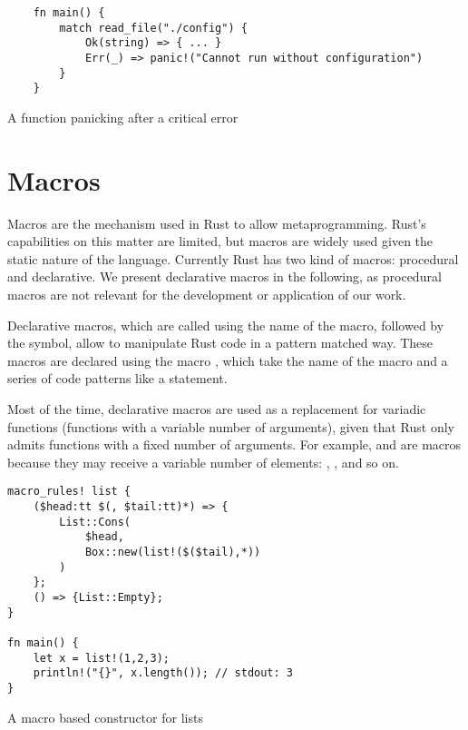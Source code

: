 \begin{listing}[h]
	\begin{verbatim}
    fn main() {
        match read_file("./config") {
            Ok(string) => { ... }
            Err(_) => panic!("Cannot run without configuration")
        }
    }
    \end{verbatim}
  \caption{A function panicking after a critical error}
  \label{lst:unrecoverable_error}
\end{listing}

\section{Macros}

Macros are the mechanism used in Rust to allow metaprogramming. Rust's
capabilities on this matter are limited, but macros are widely used given the
static nature of the language. Currently Rust has two kind of macros:
procedural and declarative. We present declarative macros in the following, as
procedural macros are not relevant for the development or application of our
work.

Declarative macros, which are called using the name of the macro, followed by the
\inrust{!} symbol, allow to manipulate Rust code in a pattern matched way. These
macros are declared using the macro , which take the name
of the macro and a series of code patterns like a  statement. 

Most of the time, declarative macros are used as a replacement for variadic
functions (functions with a variable number of arguments), given that Rust only
admits functions with a fixed number of arguments. For example, 
and  are macros because they may receive a variable number of
elements: , ,   and so
on.


\begin{listing}[h]
	\begin{verbatim}
macro_rules! list {
    ($head:tt $(, $tail:tt)*) => {
        List::Cons(
            $head, 
            Box::new(list!($($tail),*))
        )
    };
    () => {List::Empty};
}

fn main() {
    let x = list!(1,2,3);
    println!("{}", x.length()); // stdout: 3
}
    \end{verbatim}
  \caption{A macro based constructor for lists}
  \label{lst:declarative_macro}
\end{listing}

